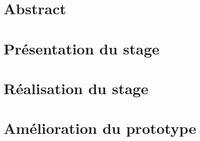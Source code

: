 \documentclass[a4paper,oneside,11pt]{article}
\begin{document}
%


\section{Abstract}



\section{Présentation du stage}



\section{Réalisation du stage}


\section{Amélioration du prototype}



%
\end{document}
